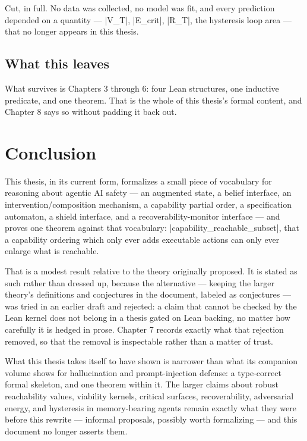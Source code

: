 \documentclass{memoir}
\begin{document}
Cut, in full. No data was collected, no model was fit, and every prediction
depended on a quantity — \LeanVerb|V_T|, \LeanVerb|E_crit|, \LeanVerb|R_T|, the hysteresis loop area —
that no longer appears in this thesis.



\section{What this leaves}\label{Capability--Monotonicity--in--a--Formal--Skeleton--for--Agentic--AI--Safety----What--Was--Cut-005F-005F-005F--and--Why----What--this--leaves}

What survives is Chapters 3 through 6: four Lean structures, one inductive
predicate, and one theorem. That is the whole of this thesis's formal
content, and Chapter 8 says so without padding it back out.





\chapter{Conclusion}\label{Capability--Monotonicity--in--a--Formal--Skeleton--for--Agentic--AI--Safety----Conclusion}

This thesis, in its current form, formalizes a small piece of vocabulary
for reasoning about agentic AI safety — an augmented state, a belief
interface, an intervention/composition mechanism, a capability partial
order, a specification automaton, a shield interface, and a
recoverability-monitor interface — and proves one theorem against that
vocabulary: \LeanVerb|capability_reachable_subset|, that a capability ordering which
only ever adds executable actions can only ever enlarge what is reachable.

That is a modest result relative to the theory originally proposed. It is
stated as such rather than dressed up, because the alternative — keeping
the larger theory's definitions and conjectures in the document, labeled as
conjectures — was tried in an earlier draft and rejected: a claim that
cannot be checked by the Lean kernel does not belong in a thesis gated on
Lean backing, no matter how carefully it is hedged in prose. Chapter 7
records exactly what that rejection removed, so that the removal is
inspectable rather than a matter of trust.

What this thesis takes itself to have shown is narrower than what its
companion volume shows for hallucination and prompt-injection defense: a
type-correct formal skeleton, and one theorem within it. The larger claims
about robust reachability values, viability kernels, critical surfaces,
recoverability, adversarial energy, and hysteresis in memory-bearing agents
remain exactly what they were before this rewrite — informal proposals,
possibly worth formalizing — and this document no longer asserts them.
\end{document}

